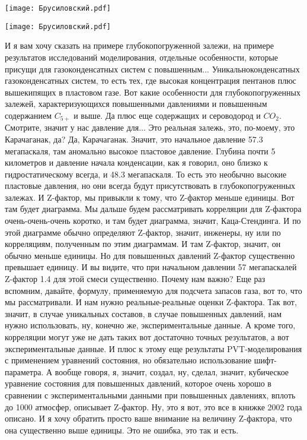 \documentclass[main.tex]{subfiles}
\begin{document}
\begin{center}
\texttt{[image: Брусиловский.pdf]}
\end{center}



\begin{center}
\texttt{[image: Брусиловский.pdf]}
\end{center}

И я вам хочу сказать на примере глубокопогруженной залежи, на примере результатов исследований моделирования, отдельные особенности, которые присущи для газоконденсатных систем с повышенным...
Уникальноконденсатных газоконденсатных систем, то есть тех, где высокая концентрация пентанов плюс вышекипящих в пластовом газе.
Вот какие особенности для глубокопогруженных залежей, характеризующихся повышенными давлениями и повышенным содержанием $C_{5+}$ и выше.
Да плюс еще содержащих и сероводород и $CO_2$.
Смотрите, значит у нас давление для... Это реальная залежь, это, по-моему, это Карачаганак, да?
Да, Карачаганак.
Значит, это начальное давление 57.3 мегапаскаля, там аномально высокое пластовое давление.
Глубина почти 5 километров и давление начала конденсации, как я говорил, оно близко к гидростатическому всегда, и 48.3 мегапаскаля.
То есть это необычно высокие пластовые давления, но они всегда будут присутствовать в глубокопогруженных залежах.
И Z-фактор, мы привыкли к тому, что Z-фактор меньше единицы.
Вот там будет диаграмма.
Мы дальше будем рассматривать корреляции для Z-фактора очень-очень-очень коротко, и там будет диаграмма, значит, Каца-Стендинга.
И по этой диаграмме обычно определяют Z-фактор, значит, инженеры, ну или по корреляциям, полученным по этим диаграммам.
И там Z-фактор, значит, он обычно меньше единицы.
Но для повышенных давлений Z-фактор существенно превышает единицу.
И вы видите, что при начальном давлении 57 мегапаскалей Z-фактор 1.4 для этой смеси существенно.
Почему нам важно?
Еще раз вспомним, давайте, формулу, применяемую для подсчета запасов газа, вот то, что мы рассматривали.
И нам нужно реальные-реальные оценки Z-фактора.
Так вот, значит, в случае уникальных составов, в случае повышенных давлений, нам нужно использовать, ну, конечно же, экспериментальные данные.
А кроме того, корреляции могут уже не дать таких вот достаточно точных результатов, а вот экспериментальные данные.
И плюс к этому еще результаты PVT-моделирования с применением уравнений состояния, но обязательно использование шифт-параметра.
А вообще говоря, я, значит, создал, ну, сделал, значит, кубическое уравнение состояния для повышенных давлений, которое очень хорошо в сравнении с экспериментальными данными при повышенных давлениях, вплоть до 1000 атмосфер, описывает Z-фактор.
Ну, это я вот, это все в книжке 2002 года описано.
И я хочу обратить просто ваше внимание на величину Z-фактора, что она существенно выше единицы.
Это не ошибка, это так и есть.
\end{document}

